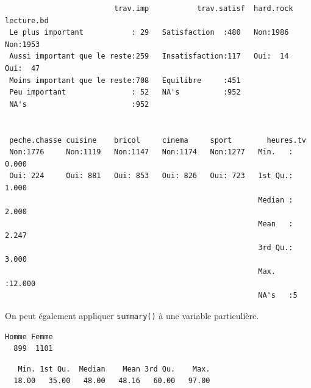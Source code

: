 \documentclass[
  letterpaper,
  DIV=11,
  numbers=noendperiod,
  oneside]{scrreprt}
\newenvironment{Shaded}{\begin{snugshade}}{\end{snugshade}}
\newcommand{\FunctionTok}[1]{\textcolor[rgb]{0.28,0.35,0.67}{#1}}
\newcommand{\NormalTok}[1]{\textcolor[rgb]{0.00,0.23,0.31}{#1}}
\newcommand{\SpecialCharTok}[1]{\textcolor[rgb]{0.37,0.37,0.37}{#1}}
\begin{document}
\begin{verbatim}
                         trav.imp           trav.satisf  hard.rock  lecture.bd
 Le plus important           : 29   Satisfaction  :480   Non:1986   Non:1953  
 Aussi important que le reste:259   Insatisfaction:117   Oui:  14   Oui:  47  
 Moins important que le reste:708   Equilibre     :451                        
 Peu important               : 52   NA's          :952                        
 NA's                        :952                                             
                                                                              
                                                                              
 peche.chasse cuisine    bricol     cinema     sport        heures.tv     
 Non:1776     Non:1119   Non:1147   Non:1174   Non:1277   Min.   : 0.000  
 Oui: 224     Oui: 881   Oui: 853   Oui: 826   Oui: 723   1st Qu.: 1.000  
                                                          Median : 2.000  
                                                          Mean   : 2.247  
                                                          3rd Qu.: 3.000  
                                                          Max.   :12.000  
                                                          NA's   :5       
\end{verbatim}

On peut également appliquer \texttt{summary()} à une variable
particulière.

\begin{Shaded}
\end{Shaded}

\begin{verbatim}
Homme Femme 
  899  1101 
\end{verbatim}

\begin{Shaded}
\end{Shaded}

\begin{verbatim}
   Min. 1st Qu.  Median    Mean 3rd Qu.    Max. 
  18.00   35.00   48.00   48.16   60.00   97.00 
\end{verbatim}
\end{document}
